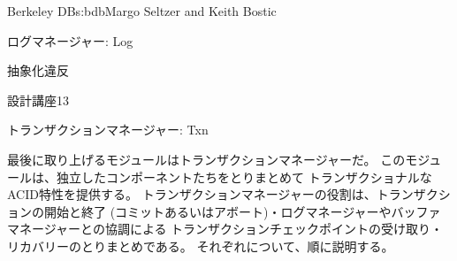 \begin{aosachapter}{Berkeley DB}{s:bdb}{Margo Seltzer and Keith Bostic}
\begin{aosasect1}{ログマネージャー: Log}
\begin{aosasect2}{抽象化違反}
\begin{aosabox}{設計講座13}
\end{aosabox}

\end{aosasect2}

\end{aosasect1}

\begin{aosasect1}{トランザクションマネージャー: Txn}

最後に取り上げるモジュールはトランザクションマネージャーだ。
このモジュールは、独立したコンポーネントたちをとりまとめて
トランザクショナルなACID特性を提供する。
トランザクションマネージャーの役割は、トランザクションの開始と終了
(コミットあるいはアボート)・ログマネージャーやバッファマネージャーとの協調による
トランザクションチェックポイントの受け取り・リカバリーのとりまとめである。
それぞれについて、順に説明する。



\end{aosasect1}
\end{aosachapter}
